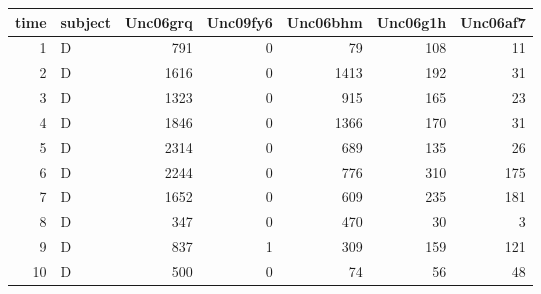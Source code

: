 \begin{tabular}{rlrrrrr}
  \hline
time & subject & Unc06grq & Unc09fy6 & Unc06bhm & Unc06g1h & Unc06af7 \\ 
  \hline
  1 & D & 791 &   0 &  79 & 108 &  11 \\ 
    2 & D & 1616 &   0 & 1413 & 192 &  31 \\ 
    3 & D & 1323 &   0 & 915 & 165 &  23 \\ 
    4 & D & 1846 &   0 & 1366 & 170 &  31 \\ 
    5 & D & 2314 &   0 & 689 & 135 &  26 \\ 
    6 & D & 2244 &   0 & 776 & 310 & 175 \\ 
    7 & D & 1652 &   0 & 609 & 235 & 181 \\ 
    8 & D & 347 &   0 & 470 &  30 &   3 \\ 
    9 & D & 837 &   1 & 309 & 159 & 121 \\ 
   10 & D & 500 &   0 &  74 &  56 &  48 \\ 
   \hline
\end{tabular}
